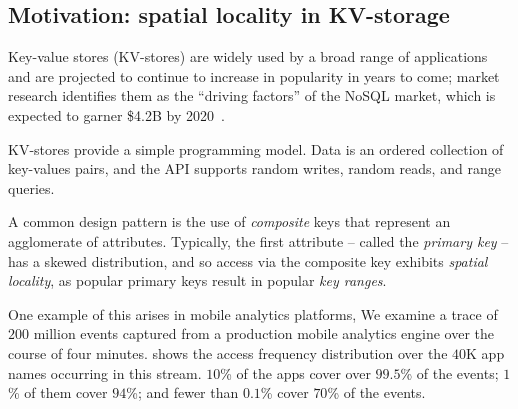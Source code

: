 \subsection{Motivation:  spatial locality in KV-storage}

Key-value stores (KV-stores) are widely used  by a broad range of applications and are projected
to continue to increase in popularity in years to come; market research  identifies them as the 
``driving factors'' of the NoSQL market, which is expected to garner \$4.2B by 2020~\cite{alliedmarketresearch}.

KV-stores provide a simple programming model. 
Data is an ordered collection of key-values pairs, and  the API supports random writes, 
random reads, and range queries. 

A common design pattern is the use of \emph{composite} keys that represent an agglomerate of attributes.
Typically, the first attribute -- called the \emph{primary key} -- has a skewed distribution, and so   access via the composite key exhibits \emph{spatial locality}, as 
popular primary keys result in popular \emph{key ranges}. 

One example of this arises in mobile analytics platforms,  
%
We examine a trace of $200$ million events captured from a production mobile analytics engine over the course of four minutes.  
 shows the access frequency distribution over the  $40$K app names occurring in this stream.  $10$\% of the apps cover over $99.5$\% of the events; $1$\% of them  cover $94$\%; and fewer 
than $0.1$\% cover $70$\% of the events. 

